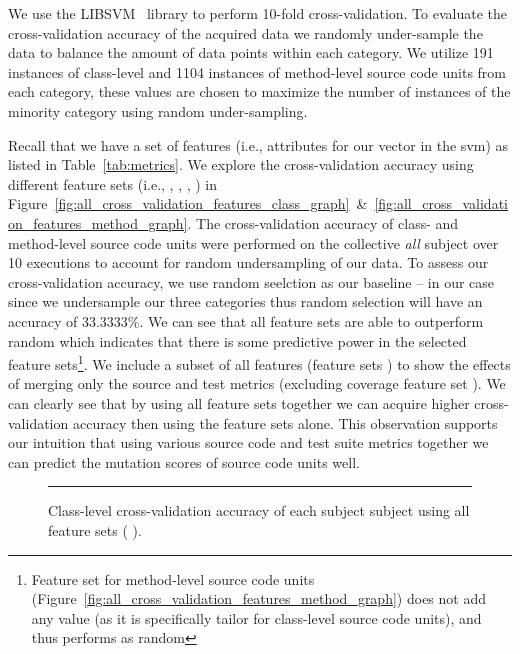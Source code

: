 We use the LIBSVM~\cite{CL11} library to perform 10-fold cross-validation. To evaluate the cross-validation accuracy of the acquired data we randomly under-sample the data to balance the amount of data points within each category. We utilize 191 instances of class-level and 1104 instances of method-level source code units from each category, these values are chosen to maximize the number of instances of the minority category using random under-sampling.

Recall that we have a set of features (i.e., attributes for our vector in the \gls{svm}) as listed in Table~\ref{tab:metrics}. We explore the cross-validation accuracy using different feature sets (i.e., , , , ) in Figure~\ref{fig:all_cross_validation_features_class_graph}~\&~\ref{fig:all_cross_validation_features_method_graph}. The cross-validation accuracy of class- and method-level source code units were performed on the collective \emph{all} subject over 10 executions to account for random undersampling of our data. To assess our cross-validation accuracy, we use random seelction as our baseline -- in our case since we undersample our three categories thus random selection will have an accuracy of 33.3333\%. We can see that all feature sets are able to outperform random which indicates that there is some predictive power in the selected feature sets\footnote{Feature set  for method-level source code units (Figure~\ref{fig:all_cross_validation_features_method_graph}) does not add any value (as it is specifically tailor for class-level source code units), and thus performs as random}. We include a subset of all features (feature sets   ) to show the effects of merging only the source and test metrics (excluding coverage feature set ). We can clearly see that by using all feature sets together we can acquire higher cross-validation accuracy then using the feature sets alone. This observation supports our intuition that using various source code and test suite metrics together we can predict the mutation scores of source code units well.

\begin{figure}[!ht]
  \centering
  \begin{adjustbox}{max size={.95\textwidth}{.95\textheight}}
    
  \end{adjustbox}
  \caption{Class-level cross-validation accuracy of each subject subject using all feature sets (   ).}
  \vspace{1mm}
  \footnotesize{\emph{}}
  \vspace{2mm}
  \hrule
  \label{fig:individual_cross_validation_class_1_2_3_4_graph}
\end{figure}

